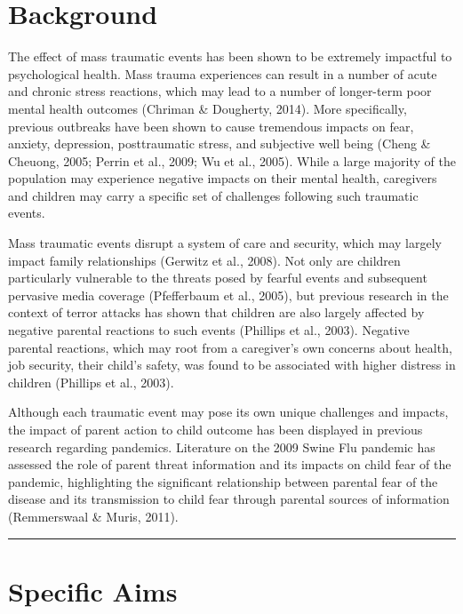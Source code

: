 \documentclass[]{book}
\begin{document}
\hypertarget{background}{%
\chapter{Background}\label{background}}

The effect of mass traumatic events has been shown to be extremely impactful to psychological health. Mass trauma experiences can result in a number of acute and chronic stress reactions, which may lead to a number of longer-term poor mental health outcomes (Chriman \& Dougherty, 2014). More specifically, previous outbreaks have been shown to cause tremendous impacts on fear, anxiety, depression, posttraumatic stress, and subjective well being (Cheng \& Cheuong, 2005; Perrin et al., 2009; Wu et al., 2005). While a large majority of the population may experience negative impacts on their mental health, caregivers and children may carry a specific set of challenges following such traumatic events.

Mass traumatic events disrupt a system of care and security, which may largely impact family relationships (Gerwitz et al., 2008). Not only are children particularly vulnerable to the threats posed by fearful events and subsequent pervasive media coverage (Pfefferbaum et al., 2005), but previous research in the context of terror attacks has shown that children are also largely affected by negative parental reactions to such events (Phillips et al., 2003). Negative parental reactions, which may root from a caregiver's own concerns about health, job security, their child's safety, was found to be associated with higher distress in children (Phillips et al., 2003).

Although each traumatic event may pose its own unique challenges and impacts, the impact of parent action to child outcome has been displayed in previous research regarding pandemics. Literature on the 2009 Swine Flu pandemic has assessed the role of parent threat information and its impacts on child fear of the pandemic, highlighting the significant relationship between parental fear of the disease and its transmission to child fear through parental sources of information (Remmerswaal \& Muris, 2011).

\begin{center}\rule{0.5\linewidth}{0.5pt}\end{center}

\hypertarget{specific-aims}{%
\chapter{Specific Aims}\label{specific-aims}}
\end{document}
